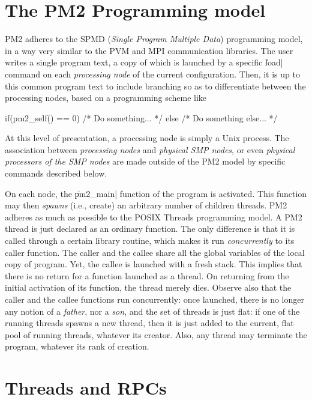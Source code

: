 \section{The PM2 Programming model}

PM2 adheres to the SPMD (\emph{Single Program Multiple Data})
programming model, in a way very similar to the PVM and MPI
communication libraries.  The user writes a single program text, a
copy of which is launched by a specific \|load| command on each
\emph{processing node} of the current configuration. Then,
it is up to this common program text to include branching so as to
differentiate between the processing nodes, based on a programming
scheme like
\begin{program}
if(pm2_self() == 0) { /* Do something... */ }
else { /* Do something else... */ }
\end{program}
At this level of presentation, a processing node is simply a Unix
process. The association between \emph{processing nodes} and
\emph{physical SMP nodes}, or even \emph{physical processors of the
  SMP nodes} are made outside of the PM2 model by specific commands
described below.


On each node, the \|pm2_main| function of the program is activated.
This function may then \emph{spawns} (i.e., create) an arbitrary
number of children threads.  PM2 adheres as much as possible to the
POSIX Threads programming model. A PM2 thread is just declared as an
ordinary function. The only difference is that it is called through a
certain library routine, which makes it run \emph{concurrently} to its
caller function. The caller and the callee share all the global
variables of the local copy of program. Yet, the callee is launched
with a fresh stack. This implies that there is no return for a
function launched as a thread. On returning from the initial
activation of its function, the thread merely dies.  Observe also that
the caller and the callee functions run concurrently: once launched,
there is no longer any notion of a \emph{father}, nor a \emph{son},
and the set of threads is just flat: if one of the running threads
spawns a new thread, then it is just added to the current, flat pool
of running threads, whatever its creator.  Also, any thread may
terminate the program, whatever its rank of creation.

\section{Threads and RPCs}

